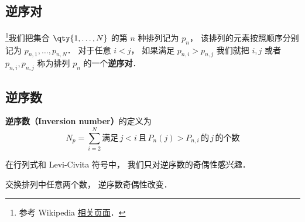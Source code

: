 
\begin{issues}
\issueDraft
\end{issues}


\subsection{逆序对}
\footnote{参考 Wikipedia \href{https://en.wikipedia.org/wiki/Inversion_(discrete_mathematics)}{相关页面}．}我们把集合 $\qty{1,\dots,N}$ 的第 $n$ 种排列记为 $p_n$， 该排列的元素按照顺序分别记为 $p_{n,1}, \dots, p_{n,N}$． 对于任意 $i < j$， 如果满足 $p_{n,i} > p_{n,j}$ 我们就把 $i, j$ 或者 $p_{n,i}, p_{n,j}$ 称为排列 $p_n$ 的一个\textbf{逆序对}．

\subsection{逆序数}
\textbf{逆序数（Inversion number）}的定义为
\begin{equation}\label{InvNum_eq5}
N_p = \sum_{i=2}^N \text{满足}\, j<i \,\text{且}\, P_n(j) > P_{n,i} \, \text{的}\, j\, \text{的个数} 
\end{equation}

在行列式和 Levi-Civita 符号中， 我们只对逆序数的奇偶性感兴趣．

交换排列中任意两个数， 逆序数奇偶性改变． 
